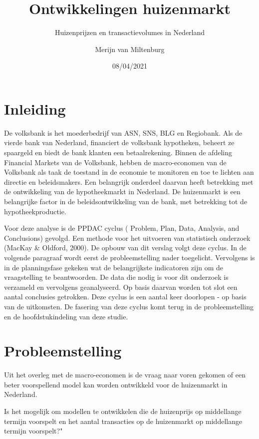 \documentclass[
]{article}
\title{Ontwikkelingen huizenmarkt}
\subtitle{Huizenprijzen en transactievolumes in Nederland}
\author{Merijn van Miltenburg}
\date{08/04/2021}
\begin{document}
\maketitle

{
\setcounter{tocdepth}{2}
\tableofcontents
}
\hypertarget{inleiding}{%
\section{Inleiding}\label{inleiding}}

De volksbank is het moederbedrijf van ASN, SNS, BLG en Regiobank. Als de
vierde bank van Nederland, financiert de volksbank hypotheken, beheert
ze spaargeld en biedt de bank klanten een betaalrekening. Binnen de
afdeling Financial Markets van de Volksbank, hebben de macro-economen
van de Volksbank als taak de toestand in de economie te monitoren en toe
te lichten aan directie en beleidsmakers. Een belangrijk onderdeel
daarvan heeft betrekking met de ontwikkeling van de hypotheekmarkt in
Nederland. De huizenmarkt is een belangrijke factor in de
beleidsontwikkeling van de bank, met betrekking tot de
hypotheekproductie.

Voor deze analyse is de PPDAC cyclus ( Problem, Plan, Data, Analysis,
and Conclusions) gevolgd. Een methode voor het uitvoeren van statistisch
onderzoek (MacKay \& Oldford, 2000). De opbouw van dit verslag volgt
deze cyclus. In de volgende paragraaf wordt eerst de probleemstelling
nader toegelicht. Vervolgens is in de planningsfase gekeken wat de
belangrijkste indicatoren zijn om de vraagstelling te beantwoorden. De
data die nodig is voor dit onderzoek is verzameld en vervolgens
geanalyseerd. Op basis daarvan worden tot slot een aantal conclusies
getrokken. Deze cyclus is een aantal keer doorlopen - op basis van de
uitkomsten. De fasering van deze cyclus komt terug in de
probleemstelling en de hoofdstukindeling van deze studie.

\hypertarget{probleemstelling}{%
\section{Probleemstelling}\label{probleemstelling}}

Uit het overleg met de macro-economen is de vraag naar voren gekomen of
een beter voorspellend model kan worden ontwikkeld voor de huizenmarkt
in Nederland.

Is het mogelijk om modellen te ontwikkelen die de huizenprijs op
middellange termijn voorspelt en het aantal transacties op de
huizenmarkt op middellange termijn voorspelt?"
\end{document}
